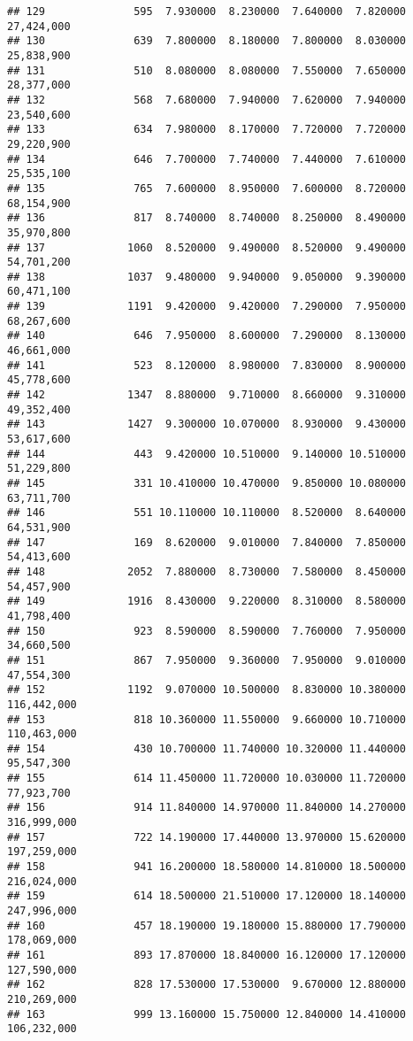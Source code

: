 \documentclass[]{article}
\begin{document}
\begin{verbatim}
## 129              595  7.930000  8.230000  7.640000  7.820000  27,424,000
## 130              639  7.800000  8.180000  7.800000  8.030000  25,838,900
## 131              510  8.080000  8.080000  7.550000  7.650000  28,377,000
## 132              568  7.680000  7.940000  7.620000  7.940000  23,540,600
## 133              634  7.980000  8.170000  7.720000  7.720000  29,220,900
## 134              646  7.700000  7.740000  7.440000  7.610000  25,535,100
## 135              765  7.600000  8.950000  7.600000  8.720000  68,154,900
## 136              817  8.740000  8.740000  8.250000  8.490000  35,970,800
## 137             1060  8.520000  9.490000  8.520000  9.490000  54,701,200
## 138             1037  9.480000  9.940000  9.050000  9.390000  60,471,100
## 139             1191  9.420000  9.420000  7.290000  7.950000  68,267,600
## 140              646  7.950000  8.600000  7.290000  8.130000  46,661,000
## 141              523  8.120000  8.980000  7.830000  8.900000  45,778,600
## 142             1347  8.880000  9.710000  8.660000  9.310000  49,352,400
## 143             1427  9.300000 10.070000  8.930000  9.430000  53,617,600
## 144              443  9.420000 10.510000  9.140000 10.510000  51,229,800
## 145              331 10.410000 10.470000  9.850000 10.080000  63,711,700
## 146              551 10.110000 10.110000  8.520000  8.640000  64,531,900
## 147              169  8.620000  9.010000  7.840000  7.850000  54,413,600
## 148             2052  7.880000  8.730000  7.580000  8.450000  54,457,900
## 149             1916  8.430000  9.220000  8.310000  8.580000  41,798,400
## 150              923  8.590000  8.590000  7.760000  7.950000  34,660,500
## 151              867  7.950000  9.360000  7.950000  9.010000  47,554,300
## 152             1192  9.070000 10.500000  8.830000 10.380000 116,442,000
## 153              818 10.360000 11.550000  9.660000 10.710000 110,463,000
## 154              430 10.700000 11.740000 10.320000 11.440000  95,547,300
## 155              614 11.450000 11.720000 10.030000 11.720000  77,923,700
## 156              914 11.840000 14.970000 11.840000 14.270000 316,999,000
## 157              722 14.190000 17.440000 13.970000 15.620000 197,259,000
## 158              941 16.200000 18.580000 14.810000 18.500000 216,024,000
## 159              614 18.500000 21.510000 17.120000 18.140000 247,996,000
## 160              457 18.190000 19.180000 15.880000 17.790000 178,069,000
## 161              893 17.870000 18.840000 16.120000 17.120000 127,590,000
## 162              828 17.530000 17.530000  9.670000 12.880000 210,269,000
## 163              999 13.160000 15.750000 12.840000 14.410000 106,232,000

\end{verbatim}
\end{document}
